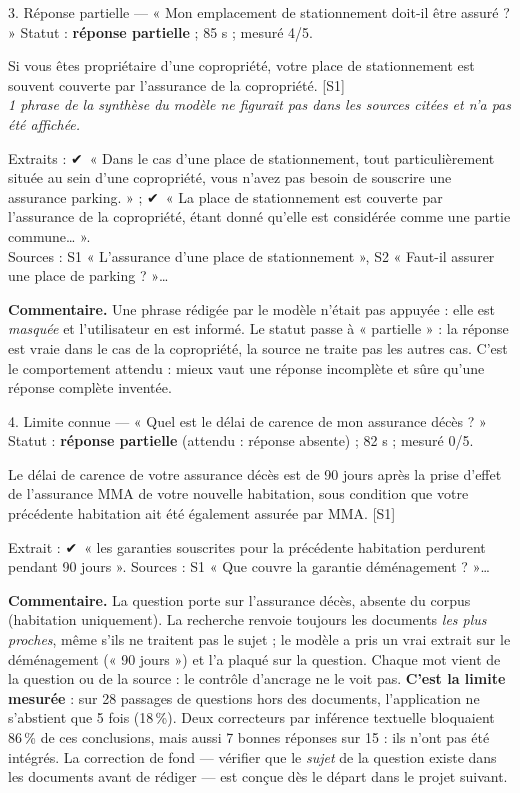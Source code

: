\documentclass[11pt,a4paper]{article}
\newcommand{\ok}{\textcolor{vert}{{\symb ✔}}}
\begin{document}
\begin{question}{3. Réponse partielle — « Mon emplacement de stationnement doit-il être assuré ? »}
Statut : \textbf{réponse partielle} ; 85 s ; mesuré 4/5.
\begin{reponse}
Si vous êtes propriétaire d'une copropriété, votre place de stationnement est souvent couverte par
l'assurance de la copropriété. [S1]\\
\emph{1 phrase de la synthèse du modèle ne figurait pas dans les sources citées et n'a pas été affichée.}
\end{reponse}
Extraits : \ok\ « Dans le cas d'une place de stationnement, tout particulièrement située au sein
d'une copropriété, vous n'avez pas besoin de souscrire une assurance parking. » ; \ok\ « La place de
stationnement est couverte par l'assurance de la copropriété, étant donné qu'elle est considérée
comme une partie commune… ».\\
Sources : S1 « L'assurance d'une place de stationnement », S2 « Faut-il assurer une place de parking ? »…

\smallskip\textbf{Commentaire.} Une phrase rédigée par le modèle n'était pas appuyée : elle est
\emph{masquée} et l'utilisateur en est informé. Le statut passe à « partielle » : la réponse est
vraie dans le cas de la copropriété, la source ne traite pas les autres cas. C'est le comportement
attendu : mieux vaut une réponse incomplète et sûre qu'une réponse complète inventée.
\end{question}

\begin{question}{4. Limite connue — « Quel est le délai de carence de mon assurance décès ? »}
Statut : \textbf{réponse partielle} (attendu : réponse absente) ; 82 s ; mesuré 0/5.
\begin{reponse}
Le délai de carence de votre assurance décès est de 90 jours après la prise d'effet de l'assurance
MMA de votre nouvelle habitation, sous condition que votre précédente habitation ait été également
assurée par MMA. [S1]
\end{reponse}
Extrait : \ok\ « les garanties souscrites pour la précédente habitation perdurent pendant 90 jours ».
Sources : S1 « Que couvre la garantie déménagement ? »…

\smallskip\textbf{Commentaire.} La question porte sur l'assurance décès, absente du corpus
(habitation uniquement). La recherche renvoie toujours les documents \emph{les plus proches},
même s'ils ne traitent pas le sujet ; le modèle a pris un vrai extrait sur le déménagement
(« 90 jours ») et l'a plaqué sur la question. Chaque mot vient de la question ou de la source :
le contrôle d'ancrage ne le voit pas. \textbf{C'est la limite mesurée} : sur 28 passages de
questions hors des documents, l'application ne s'abstient que 5 fois (18\,\%). Deux correcteurs
par inférence textuelle bloquaient 86\,\% de ces conclusions, mais aussi 7 bonnes réponses sur 15 :
ils n'ont pas été intégrés. La correction de fond — vérifier que le \emph{sujet} de la question
existe dans les documents avant de rédiger — est conçue dès le départ dans le projet suivant.
\end{question}
\end{document}
